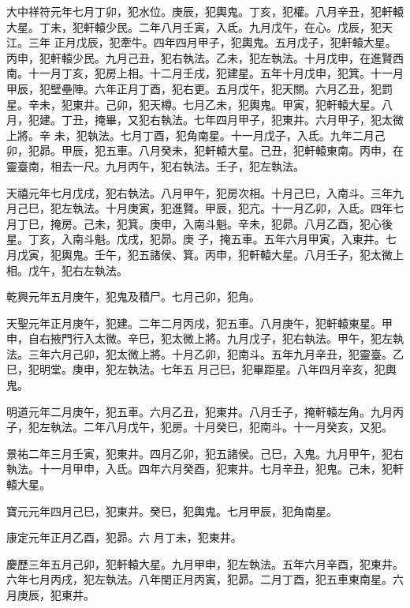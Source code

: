 \begin{pinyinscope}
 大中祥符元年七月丁卯，犯水位。庚辰，犯輿鬼。丁亥，犯權。八月辛丑，犯軒轅大星。丁未，犯軒轅少民。二年八月壬寅，入氐。九月戊午，在心。戊辰，犯天江。三年
 正月戊辰，犯牽牛。四年四月甲子，犯輿鬼。五月戊子，犯軒轅大星。丙申，犯軒轅少民。九月己丑，犯右執法。乙未，犯左執法。十月戊申，在進賢西南。十一月丁亥，犯房上相。十二月壬戌，犯建星。五年十月戊申，犯箕。十一月甲辰，犯壁壘陣。六年正月丁酉，犯右更。五月戊午，犯天關。六月乙丑，犯罰星。辛未，犯東井。己卯，犯天樽。七月乙未，犯輿鬼。甲寅，犯軒轅大星。八月，犯建。丁丑，掩畢，又犯右執法。七年四月甲子，犯東井。六月甲子，犯太微上將。辛
 未，犯執法。七月丁酉，犯角南星。十一月戊子，入氐。九年二月己卯，犯昴。甲辰，犯五車。八月癸未，犯軒轅大星。己丑，犯軒轅東南。丙申，在靈臺南，相去一尺。九月丙午，犯右執法。壬子，犯左執法。



 天禧元年七月戊戌，犯右執法。八月甲午，犯房次相。十月己巳，入南斗。三年九月己巳，犯左執法。十月庚寅，犯進賢。甲辰，犯亢。十一月乙卯，入氐。四年七月丁巳，掩房。己未，犯箕。庚申，入南斗魁。辛未，犯昴。八月乙酉，犯心後星。丁亥，入南斗魁。戊戌，犯昴。庚
 子，掩五車。五年六月甲寅，入東井。七月戊寅，犯輿鬼。壬午，犯五諸侯、箕。丙申，犯軒轅大星。八月壬子，犯太微上相。戊午，犯右左執法。



 乾興元年五月庚午，犯鬼及積尸。七月己卯，犯角。



 天聖元年正月庚午，犯建。二年二月丙戌，犯五車。八月庚午，犯軒轅東星。甲申，自右掖門行入太微。辛巳，犯太微上將。九月戊子，犯右執法。甲午，犯左執法。三年六月己卯，犯太微上將。十月乙卯，犯南斗。五年九月辛丑，犯靈臺。乙巳，犯明堂。庚申，犯左執法。七年五
 月己巳，犯畢距星。八年四月辛亥，犯輿鬼。



 明道元年二月庚午，犯五車。六月乙丑，犯東井。八月壬子，掩軒轅左角。九月丙子，犯左執法。二年八月戊午，犯房。十月癸巳，犯南斗。十一月癸亥，又犯。



 景祐二年三月壬寅，犯東井。四月乙卯，犯五諸侯。己巳，入鬼。九月甲午，犯右執法。十一月甲申，入氐。四年六月癸酉，犯東井。七月辛丑，犯鬼。己未，犯軒轅大星。



 寶元元年四月己巳，犯東井。癸巳，犯輿鬼。七月甲辰，犯角南星。



 康定元年正月乙酉，犯昴。六
 月丁未，犯東井。



 慶歷三年五月己卯，犯軒轅大星。九月甲申，犯左執法。五年六月辛酉，犯東井。六年七月丙戌，犯左執法。八年閏正月丙寅，犯昴。二月丁酉，犯五車東南星。六月庚辰，犯東井。




\end{pinyinscope}
